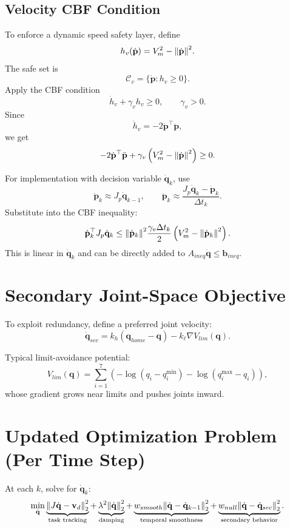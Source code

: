 \documentclass[11pt,a4paper]{article}
\begin{document}
\subsection{Velocity CBF Condition}
To enforce a dynamic speed safety layer, define
\[
h_v(\dot{\mathbf{p}})=V_m^2-\norm{\dot{\mathbf{p}}}^2.
\]
The safe set is
\[
\mathcal{C}_v=\{\dot{\mathbf{p}}: h_v\ge 0\}.
\]
Apply the CBF condition
\[
\dot{h}_v+\gamma_v h_v\ge 0,\qquad \gamma_v>0.
\]
Since
\[
\dot{h}_v=-2\dot{\mathbf{p}}^\top\ddot{\mathbf{p}},
\]
we get
\[
-2\dot{\mathbf{p}}^\top\ddot{\mathbf{p}}+\gamma_v\left(V_m^2-\norm{\dot{\mathbf{p}}}^2\right)\ge 0.
\]

For implementation with decision variable \(\dot{\mathbf{q}}_k\), use
\[
\dot{\mathbf{p}}_k \approx J_p\dot{\mathbf{q}}_{k-1},\qquad
\ddot{\mathbf{p}}_k \approx \frac{J_p\dot{\mathbf{q}}_k-\dot{\mathbf{p}}_k}{\Delta t_k}.
\]
Substitute into the CBF inequality:
\[
\dot{\mathbf{p}}_k^\top J_p\dot{\mathbf{q}}_k
\le
\norm{\dot{\mathbf{p}}_k}^2
\frac{\gamma_v\Delta t_k}{2}\left(V_m^2-\norm{\dot{\mathbf{p}}_k}^2\right).
\]
This is linear in \(\dot{\mathbf{q}}_k\) and can be directly added to \(A_{ineq}\dot{\mathbf{q}}\le \mathbf{b}_{ineq}\).

\section{Secondary Joint-Space Objective}

To exploit redundancy, define a preferred joint velocity:
\[
\dot{\mathbf{q}}_{sec}
=
k_h(\mathbf{q}_{home}-\mathbf{q})
-k_\ell \nabla V_{lim}(\mathbf{q}).
\]

Typical limit-avoidance potential:
\[
V_{lim}(\mathbf{q})=
\sum_{i=1}^7
\left(
-\log(q_i-q_i^{\min})-\log(q_i^{\max}-q_i)
\right),
\]
whose gradient grows near limits and pushes joints inward.

\section{Updated Optimization Problem (Per Time Step)}

At each \(k\), solve for \(\dot{\mathbf{q}}_k\):
\[
\min_{\dot{\mathbf{q}}}
\underbrace{\norm{J\dot{\mathbf{q}}-\mathbf{v}_d}_2^2}_{\text{task tracking}}
+\underbrace{\lambda^2\norm{\dot{\mathbf{q}}}_2^2}_{\text{damping}}
+\underbrace{w_{smooth}\norm{\dot{\mathbf{q}}-\dot{\mathbf{q}}_{k-1}}_2^2}_{\text{temporal smoothness}}
+\underbrace{w_{null}\norm{\dot{\mathbf{q}}-\dot{\mathbf{q}}_{sec}}_2^2}_{\text{secondary behavior}}.
\]
\end{document}
